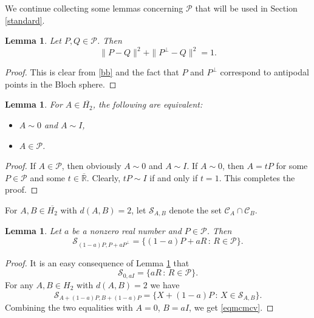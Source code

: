 \documentclass[10pt]{amsart}
\newtheorem{lemma}[theorem]{Lemma}
\theoremstyle{definition}
\theoremstyle{remark}
\numberwithin{subsection}{section}
\numberwithin{equation}{section}
\newcommand\cP{{\mathcal{P}}}
\newcommand\oH{{\overline{H_2}}}
\newcommand\oR{{\overline{\mathbb{R}}}}
\begin{document}
We continue collecting some lemmas concerning $\cP$ that will be used in Section \ref{standard}.
\begin{lemma}\label{matrum}
Let $P,Q \in \mathcal{P}$. Then
\[
\| P -Q \|^2 + \| P^\perp - Q\|^2 = 1.
\]
\end{lemma}
\begin{proof}
This is clear from \eqref{bb} and the fact that $P$ and $P^{\perp}$ correspond to antipodal points in the Bloch sphere.
\end{proof}


\begin{lemma}\label{veryeasy}
For $A\in \oH$, the following are equivalent:
\begin{itemize}
\item $A \sim 0$ and $A\sim I$,
\item $A \in \mathcal{P}$.
\end{itemize}
\end{lemma}
\begin{proof}
If $A \in \mathcal{P}$, then obviously $A \sim 0$ and $A\sim I$. If $A \sim 0$, then $A = tP$ for some $P \in \mathcal{P}$ and some $t \in {\oR}$. Clearly, $tP \sim I$ if and only if $t=1$. This completes the proof.
\end{proof}


For $A,B \in \oH$ with $d(A,B) = 2$, let $\mathcal{S}_{A,B}$  denote the set $\mathcal{C}_A \cap \mathcal{C}_B$. 


\begin{lemma}\label{mcmcv}
Let $a$ be a nonzero real number and $P \in \mathcal{P}$. 
Then
\begin{equation}\label{eqmcmcv}
\mathcal{S}_{(1-a)P, P + aP^\perp} = \{ (1-a)P + aR\, : \, R \in \mathcal{P} \}.
\end{equation}
\end{lemma}
\begin{proof}
It is an easy consequence of Lemma \ref{veryeasy} that
\[
\mathcal{S}_{0, aI} = \{  aR\, : \, R \in \mathcal{P} \}.
\]
For any $A,B \in H_2$ with $d(A,B) = 2$ we have
\[
\mathcal{S}_{A + (1-a)P, B + (1-a) P} =  \{X+(1-a)P \,:\, X\in\mathcal{S}_{A,B}\}.
\] 
Combining the two equalities with $A=0$, $B=aI$, we get \eqref{eqmcmcv}.
\end{proof}
\end{document}
